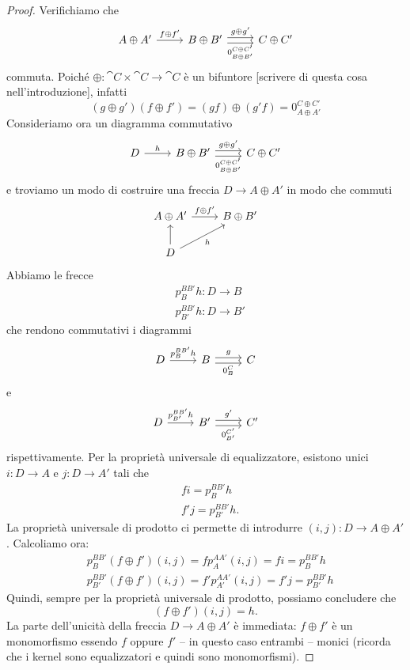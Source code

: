 \begin{proof}
  Verifichiamo che
  \[
    \begin{tikzcd}
      A \oplus A' \ar["{f \oplus f'}", r] & B \oplus B' \ar["{g \oplus
        g'}", r, shift left] \ar["{0_{B \oplus B'}^{C \oplus C'}}", r,
      shift right, swap] & C \oplus C'
    \end{tikzcd}
  \]
  commuta. Poiché \(\oplus : \cat C \times \cat C \to \cat C\) è un
  bifuntore {\color{red} [scrivere di questa cosa nell'introduzione]},
  infatti
  \[
    (g \oplus g') (f \oplus f') = (g f) \oplus (g' f)
    = 0_{A \oplus A'}^{C \oplus C'}
  \]
  Consideriamo ora un diagramma commutativo
  \[
    \begin{tikzcd}
      D \ar["{h}", r] & B \oplus B' \ar["{g \oplus g'}", r, shift left]
      \ar["{0_{B \oplus B'}^{C \oplus C'}}", r, shift right, swap] & C
      \oplus C'
    \end{tikzcd}
  \]
  e troviamo un modo di costruire una freccia \(D \to A \oplus A'\) in
  modo che commuti
  \[
    \begin{tikzcd}
      A \oplus A' \ar["{f \oplus f'}", r] & B \oplus B' \\
      D \ar["{h}", ur, swap] \ar["{}", u]
    \end{tikzcd}
  \]
  Abbiamo le frecce
  \begin{align*}
    & p_B^{BB'} h : D \to B \\
    & p_{B'}^{BB'} h : D \to B'
  \end{align*}
  che rendono commutativi i diagrammi
  \[
    \begin{tikzcd}
      D \ar["{p_B^{BB'} h}", r] & B \ar["{g}", r, shift left]
      \ar["{0_B^C}", r, shift right, swap] & C
    \end{tikzcd}
  \]
  e
  \[
    \begin{tikzcd}
      D \ar["{p_{B'}^{BB'} h}", r] & B' \ar["{g'}", r, shift left]
      \ar["{0_{B'}^{C'}}", r, shift right, swap] & C'
    \end{tikzcd}
  \]
  rispettivamente. Per la proprietà universale di equalizzatore,
  esistono unici \(i : D \to A\) e \(j : D \to A'\) tali che
  \begin{align*}
    & f i = p_B^{BB'} h \\
    & f' j = p_{B'}^{BB'} h .
  \end{align*}
  La proprietà universale di prodotto ci permette di introdurre
  \((i,j) : D \to A \oplus A'\).  Calcoliamo ora:
  \begin{align*}
    & p_B^{BB'} (f \oplus f') (i,j) = f p_A^{AA'} (i,j) = f i = p_B^{BB'} h \\
    & p_{B'}^{BB'} (f \oplus f') (i,j) = f' p_{A'}^{AA'} (i,j) = f' j = p_{B'}^{BB'} h
  \end{align*}
  Quindi, sempre per la proprietà universale di prodotto, possiamo
  concludere che
  \[
    (f \oplus f') (i,j) = h.
  \]
  La parte dell'unicità della freccia \(D \to A \oplus A'\) è immediata:
  \(f \oplus f'\) è un monomorfismo essendo \(f\) oppure \(f'\) -- in
  questo caso entrambi -- monici (ricorda che i kernel sono
  equalizzatori e quindi sono monomorfismi).
\end{proof}




